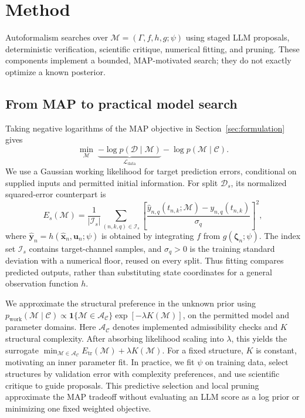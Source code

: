 \section{Method}
\label{sec:method}
\label{sec:autoformalism-method}

Autoformalism searches over $\mathcal M=(\Gamma,f,h,g;\psi)$ using staged
LLM proposals, deterministic verification, scientific critique, numerical
fitting, and pruning. These components implement a bounded, MAP-motivated
search; they do not exactly optimize a known posterior.

\subsection{From MAP to practical model search}

Taking negative logarithms of the MAP objective in
Section~\ref{sec:formulation} gives
\begin{equation}
 \min_{\mathcal M}\;
 \underbrace{-\log p(\mathcal D\mid\mathcal M)}_{\mathcal L_{\mathrm{data}}}
 -\log p(\mathcal M\mid\mathcal C).
 \label{eq:af-map-energy}
\end{equation}
We use a Gaussian working likelihood for target prediction errors,
conditional on supplied inputs and permitted initial information.
For split $\mathcal D_s$, its normalized squared-error counterpart is
\begin{equation}
 E_s(\mathcal M)=\frac{1}{|\mathcal I_s|}
 \sum_{(n,k,q)\in\mathcal I_s}
 \left[
 \frac{\widehat y_{n,q}(t_{n,k};\mathcal M)-y_{n,q}(t_{n,k})}
 {\sigma_q}
 \right]^2,
 \label{eq:af-output-loss}
\end{equation}
where $\widehat{\mathbf y}_n=h(\widehat{\mathbf x}_n,\mathbf u_n;\psi)$
is obtained by integrating $f$ from $g(\boldsymbol\zeta_n;\psi)$.
The index set $\mathcal I_s$ contains target-channel samples, and
$\sigma_q>0$ is the training standard deviation with a numerical floor,
reused on every split. Thus fitting compares predicted outputs, rather
than substituting state coordinates for a general observation function $h$.

We approximate the structural preference in the unknown prior using
$p_{\mathrm{work}}(\mathcal M\mid\mathcal C)\propto
\mathbf 1\{\mathcal M\in\mathcal A_{\mathcal C}\}
\exp[-\lambda K(\mathcal M)]$, on the permitted model and parameter domains.
Here $\mathcal A_{\mathcal C}$ denotes implemented admissibility checks
and $K$ structural complexity. After absorbing likelihood scaling into
$\lambda$, this yields the surrogate
$\min_{\mathcal M\in\mathcal A_{\mathcal C}}
E_{\mathrm{tr}}(\mathcal M)+\lambda K(\mathcal M)$.
For a fixed structure, $K$ is constant, motivating an inner parameter fit.
In practice, we fit $\psi$ on training data, select
structures by validation error with complexity preferences, and use
scientific critique to guide proposals. This predictive selection and
local pruning approximate the MAP tradeoff without evaluating an LLM
score as a log prior or minimizing one fixed weighted objective.


